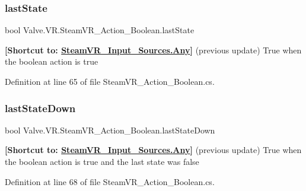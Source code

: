 \subsubsection{\texorpdfstring{lastState}{lastState}}
{\footnotesize\ttfamily bool Valve.\+V\+R.\+Steam\+V\+R\+\_\+\+Action\+\_\+\+Boolean.\+last\+State\hspace{0.3cm}{\ttfamily [get]}}



{\bfseries{\mbox{[}Shortcut to\+: \mbox{\hyperlink{namespace_valve_1_1_v_r_a82e5bf501cc3aa155444ee3f0662853faed36a1ef76a59ee3f15180e0441188ad}{Steam\+V\+R\+\_\+\+Input\+\_\+\+Sources.\+Any}}\mbox{]}}} (previous update) True when the boolean action is true 



Definition at line 65 of file Steam\+V\+R\+\_\+\+Action\+\_\+\+Boolean.\+cs.

\mbox{\label{class_valve_1_1_v_r_1_1_steam_v_r___action___boolean_a64ec97a985e100ec2279dbdd990e6667}} 
\subsubsection{\texorpdfstring{lastStateDown}{lastStateDown}}
{\footnotesize\ttfamily bool Valve.\+V\+R.\+Steam\+V\+R\+\_\+\+Action\+\_\+\+Boolean.\+last\+State\+Down\hspace{0.3cm}{\ttfamily [get]}}



{\bfseries{\mbox{[}Shortcut to\+: \mbox{\hyperlink{namespace_valve_1_1_v_r_a82e5bf501cc3aa155444ee3f0662853faed36a1ef76a59ee3f15180e0441188ad}{Steam\+V\+R\+\_\+\+Input\+\_\+\+Sources.\+Any}}\mbox{]}}} (previous update) True when the boolean action is true and the last state was false 



Definition at line 68 of file Steam\+V\+R\+\_\+\+Action\+\_\+\+Boolean.\+cs.

\mbox{\label{class_valve_1_1_v_r_1_1_steam_v_r___action___boolean_a9ae6503bdd49781fff0a4ae2ed92a546}} 
